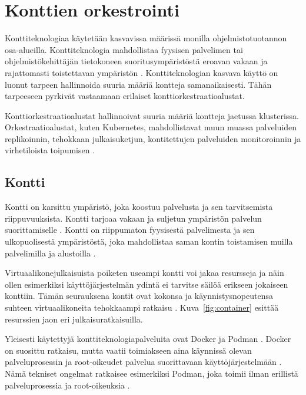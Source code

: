 \chapter{Konttien orkestrointi\label{orchestration}}

Konttiteknologiaa käytetään kasvavissa määrissä monilla ohjelmistotuotannon osa-alueilla.
Konttiteknologia mahdollistaa fyysisen palvelimen tai ohjelmistökehittäjän tietokoneen suoritusympäristöstä eroavan vakaan ja rajattomasti toistettavan ympäristön \cite{Watada19}.
Konttiteknologian kasvava käyttö on luonut tarpeen hallinnoida suuria määriä kontteja samanaikaisesti.
Tähän tarpeeseen pyrkivät vastaamaan erilaiset konttiorkestraatioalustat.

Konttiorkestraatioalustat hallinnoivat suuria määriä kontteja jaetussa klusterissa.
Orkestraatioalustat, kuten Kubernetes, mahdollistavat muun muassa palveluiden replikoinnin, tehokkaan julkaisuketjun, kontitettujen palveluiden monitoroinnin ja virhetiloista toipumisen \cite{Khan17}.

\section{Kontti\label{container}}


Kontti on karsittu ympäristö, joka koostuu palvelusta ja sen tarvitsemista riippuvuuksista.
Kontti tarjoaa vakaan ja suljetun ympäristön palvelun suorittamiselle \cite{Watada19}.
Kontti on riippumaton fyysisestä palvelimesta ja sen ulkopuolisestä ympäristöstä, joka mahdollistaa saman kontin toistamisen muilla palvelimilla ja alustoilla \cite{Saha18}.

Virtuaalikonejulkaisuista poiketen useampi kontti voi jakaa resursseja ja näin ollen esimerkiksi käyttöjärjestelmän ydintä ei tarvitse säilöä erikseen jokaiseen konttiin.
Tämän seurauksena kontit ovat kokonsa ja käynnistysnopeutensa suhteen virtuaalikoneita tehokkaampi ratkaisu \cite{Dua14}.
Kuva~\ref{fig:container} esittää resurssien jaon eri julkaisuratkaisuilla.

Yleisesti käytettyjä konttiteknologiapalveluita ovat Docker ja Podman \cite{Abraham20, Bernstein14}.
Docker on suosittu ratkaisu, mutta vaatii toimiakseen aina käynnissä olevan palveluprosessin ja root-oikeudet palvelua suorittavaan käyttöjärjestelmään \cite{Abraham20}.
Nämä tekniset ongelmat ratkaisee esimerkiksi Podman, joka toimii ilman erillistä palveluprosessia ja root-oikeuksia \cite{Gantikow20}.

